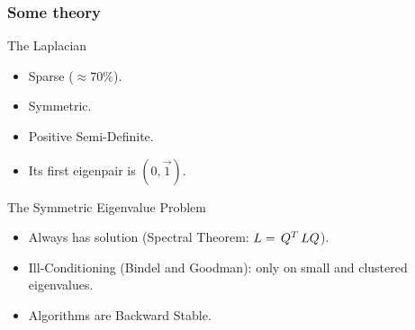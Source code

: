 \begin{frame}
  \frametitle{Some theory}
  \begin{block}{The Laplacian}
    \begin{itemize}
    \item Sparse ($\approx 70\%$).
    \item Symmetric. 
    \item Positive Semi-Definite.
    \item Its first eigenpair is $(0,\vec{1}).$
    \end{itemize}
  \end{block}
  \begin{block}{The Symmetric Eigenvalue Problem}
    \begin{itemize}
    \item Always has solution (Spectral Theorem: $L = \,{Q}^{T}\,LQ$).
    \item Ill-Conditioning (Bindel and Goodman): only on small and clustered eigenvalues. 
    \item Algorithms are Backward Stable.
    \end{itemize}
  \end{block}  
\end{frame}
